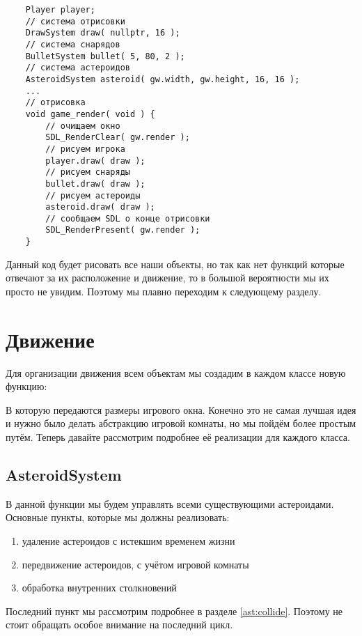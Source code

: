 \begin{lstlisting}
    Player player;
    // система отрисовки
    DrawSystem draw( nullptr, 16 );
    // система снарядов
    BulletSystem bullet( 5, 80, 2 );
    // система астероидов
    AsteroidSystem asteroid( gw.width, gw.height, 16, 16 );
    ...
    // отрисовка
    void game_render( void ) {
        // очищаем окно
        SDL_RenderClear( gw.render );
        // рисуем игрока
        player.draw( draw );
        // рисуем снаряды
        bullet.draw( draw );
        // рисуем астероиды
        asteroid.draw( draw );
        // сообщаем SDL о конце отрисовки
        SDL_RenderPresent( gw.render );
    }
\end{lstlisting}

Данный код будет рисовать все наши объекты, но так как нет функций которые отвечают 
за их расположение и движение, то в большой вероятности мы их просто не увидим. Поэтому 
мы плавно переходим к следующему разделу.

\pagebreak

\section{Движение}
Для организации движения всем объектам мы создадим в каждом классе новую функцию:


В которую передаются размеры игрового окна. Конечно это не самая лучшая идея и нужно 
было делать абстракцию игровой комнаты, но мы пойдём более простым путём. Теперь 
давайте рассмотрим подробнее её реализации для каждого класса.

\subsection{AsteroidSystem}
В данной функции мы будем управлять всеми существующими астероидами. Основные пункты, 
которые мы должны реализовать:
\begin{enumerate}
    \item удаление астероидов с истекшим временем жизни
    \item передвижение астероидов, с учётом игровой комнаты
    \item обработка внутренних столкновений
\end{enumerate}

Последний пункт мы рассмотрим подробнее в разделе \ref{ast:collide}. Поэтому не стоит 
обращать особое внимание на последний цикл.


